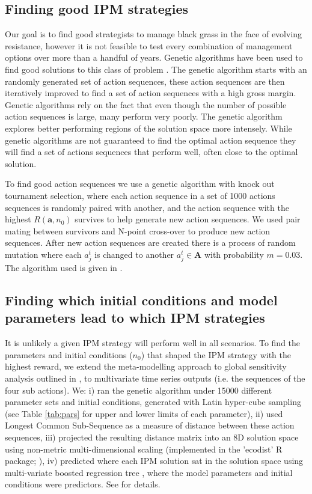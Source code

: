 \documentclass[12pt, a4paper]{article}
\begin{document}
\subsection*{Finding good IPM strategies} 
Our goal is to find good strategists to manage black grass in the face of evolving resistance, however it is not feasible to test every combination of management options over more than a handful of years. Genetic algorithms have been used to find good solutions to this class of problem \citep{Tayl2004GA, Carr2010}. The genetic algorithm starts with an randomly generated set of action sequences, these action sequences are then iteratively improved to find a set of action sequences with a high gross margin. Genetic algorithms rely on the fact that even though the number of possible action sequences is large, many perform very poorly. The genetic algorithm explores better performing regions of the solution space more intensely. While genetic algorithms are not guaranteed to find the optimal action sequence they will find a set of actions sequences that perform well, often close to the optimal solution.   

To find good action sequences we use a genetic algorithm with knock out tournament selection, where each action sequence in a set of 1000 actions sequences is randomly paired with another, and the action sequence with the highest $R(\mathbf{a}, n_0)$ survives to help generate new action sequences. We used pair mating between survivors and N-point cross-over to produce new action sequences. After new action sequences are created there is a process of random mutation where each $a_j^t$ is changed to another $a_j^t \in \mathbf{A}$ with probability $m = 0.03$. The algorithm used is given in .        

\subsection*{Finding which initial conditions and model parameters lead to which IPM strategies}
It is unlikely a given IPM strategy will perform well in all scenarios. To find the parameters and initial conditions ($n_0$) that shaped the IPM strategy with the highest reward, we extend the meta-modelling approach to global sensitivity analysis outlined in \citet{Cout2014}, to multivariate time series outputs (i.e. the sequences of the four sub actions). We: i) ran the genetic algorithm under 15000 different parameter sets and initial conditions, generated with Latin hyper-cube sampling (see Table \ref{tab:pars} for upper and lower limits of each parameter), ii) used Longest Common Sub-Sequence \citep{Tooh2015} as a measure of distance between these action sequences, iii) projected the resulting distance matrix into an 8D solution space using non-metric multi-dimensional scaling (implemented in the 'ecodist' R package; \citealt{Gosl2007}), iv) predicted where each IPM solution sat in the solution space using multi-variate boosted regression tree \citep{Mill2016}, where the model parameters and initial conditions were predictors. See  for details.
\end{document}

